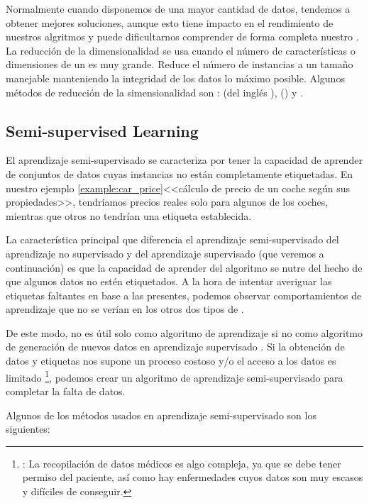 Normalmente cuando disponemos de una mayor cantidad de datos, tendemos a obtener mejores soluciones, aunque esto tiene impacto en el rendimiento de nuestros algritmos y puede dificultarnos comprender de forma completa nuestro .
La reducción de la dimensionalidad se usa cuando el número de características o dimensiones de un  es muy grande. Reduce el número de instancias a un tamaño manejable manteniendo la integridad de los datos lo máximo posible. Algunos métodos de reducción de la simensionalidad son :  (del inglés ),  () y .

\subsection{Semi-supervised Learning}

El aprendizaje semi-supervisado se caracteriza por tener la capacidad de aprender de conjuntos de datos cuyas instancias no están completamente etiquetadas. En nuestro ejemplo \ref{example:car_price}<<cálculo de precio de un coche según sus propiedades>>, tendríamos precios reales solo para algunos de los coches, mientras que otros no tendrían una etiqueta establecida.

La característica principal que diferencia el aprendizaje semi-supervisado del aprendizaje no supervisado y del aprendizaje supervisado (que veremos a continuación) es que la capacidad de aprender del algoritmo se nutre del hecho de que algunos datos no estén etiquetados. A la hora de intentar averiguar las etiquetas faltantes en base a las presentes, podemos observar comportamientos de aprendizaje que no se verían en los otros dos tipos de .

De este modo, no es útil solo como algoritmo de aprendizaje si no como algoritmo de generación de nuevos datos en aprendizaje supervisado . Si la obtención de datos y etiquetas nos supone un proceso costoso y/o el acceso a los datos es limitado \footnote{\pe: La recopilación de datos médicos es algo compleja, ya que se debe tener permiso del paciente, así como hay enfermedades cuyos datos son muy escasos y difíciles de conseguir.}, podemos crear un algoritmo de aprendizaje semi-supervisado para completar la falta de datos.

Algunos de los métodos usados en aprendizaje semi-supervisado son los siguientes:

